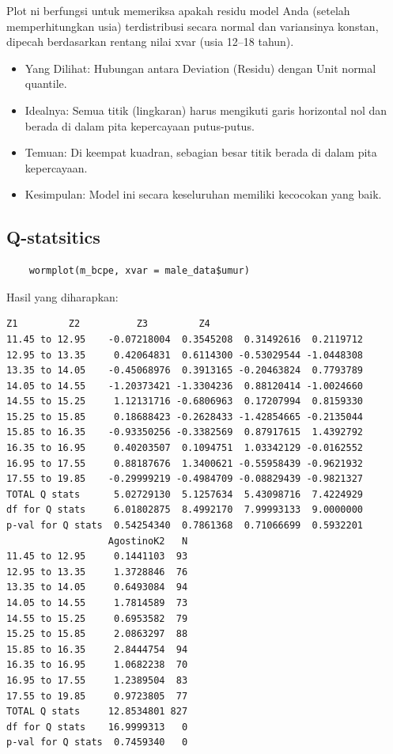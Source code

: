 \documentclass[11pt, a4paper]{article}
\begin{document}
\begin{enumerate}
Plot ni berfungsi untuk memeriksa apakah residu model Anda (setelah memperhitungkan usia) terdistribusi secara normal dan variansinya konstan, dipecah berdasarkan rentang nilai xvar (usia 12–18 tahun).
\begin{itemize}
    \item Yang Dilihat: Hubungan antara Deviation (Residu) dengan Unit normal quantile.
    \item Idealnya: Semua titik (lingkaran) harus mengikuti garis horizontal nol dan berada di dalam pita kepercayaan putus-putus.
    \item Temuan: Di keempat kuadran, sebagian besar titik berada di dalam pita kepercayaan.
    \item Kesimpulan: Model ini secara keseluruhan memiliki kecocokan yang baik.
\end{itemize}
\subsection{Q-statsitics}
    \begin{lstlisting}
    wormplot(m_bcpe, xvar = male_data$umur)
    \end{lstlisting}
Hasil yang diharapkan:
\begin{Verbatim}[frame=single]
                           Z1         Z2          Z3         Z4
11.45 to 12.95    -0.07218004  0.3545208  0.31492616  0.2119712
12.95 to 13.35     0.42064831  0.6114300 -0.53029544 -1.0448308
13.35 to 14.05    -0.45068976  0.3913165 -0.20463824  0.7793789
14.05 to 14.55    -1.20373421 -1.3304236  0.88120414 -1.0024660
14.55 to 15.25     1.12131716 -0.6806963  0.17207994  0.8159330
15.25 to 15.85     0.18688423 -0.2628433 -1.42854665 -0.2135044
15.85 to 16.35    -0.93350256 -0.3382569  0.87917615  1.4392792
16.35 to 16.95     0.40203507  0.1094751  1.03342129 -0.0162552
16.95 to 17.55     0.88187676  1.3400621 -0.55958439 -0.9621932
17.55 to 19.85    -0.29999219 -0.4984709 -0.08829439 -0.9821327
TOTAL Q stats      5.02729130  5.1257634  5.43098716  7.4224929
df for Q stats     6.01802875  8.4992170  7.99993133  9.0000000
p-val for Q stats  0.54254340  0.7861368  0.71066699  0.5932201
                  AgostinoK2   N
11.45 to 12.95     0.1441103  93
12.95 to 13.35     1.3728846  76
13.35 to 14.05     0.6493084  94
14.05 to 14.55     1.7814589  73
14.55 to 15.25     0.6953582  79
15.25 to 15.85     2.0863297  88
15.85 to 16.35     2.8444754  94
16.35 to 16.95     1.0682238  70
16.95 to 17.55     1.2389504  83
17.55 to 19.85     0.9723805  77
TOTAL Q stats     12.8534801 827
df for Q stats    16.9999313   0
p-val for Q stats  0.7459340   0
\end{Verbatim}


\end{enumerate}
\end{document}
